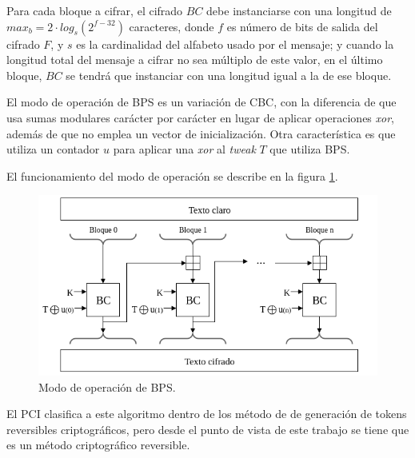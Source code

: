 Para cada bloque a cifrar, el cifrado $BC$ debe instanciarse con una longitud
de $max_b = 2 \cdot log_s(2^{f-32})$ caracteres, donde $f$ es número de bits
de salida del cifrado $F$, y $s$ es la cardinalidad del alfabeto usado por el
mensaje; y cuando la longitud total del mensaje a cifrar no sea múltiplo de
este valor, en el último bloque, $BC$ se tendrá que instanciar con una longitud
igual a la de ese bloque.

El modo de operación de BPS es un variación de CBC, con la diferencia de que
usa sumas modulares carácter por carácter en lugar de aplicar operaciones
\textit{xor}, además de que no emplea un vector de inicialización.
Otra característica es que utiliza un contador $u$ para aplicar una \textit{xor}
al \textit{tweak} $T$ que utiliza BPS.

El funcionamiento del modo de operación se describe en la figura \ref{modo_bps}.

\begin{figure}
  \begin{center}
    \includegraphics[width=0.85\linewidth]
    {../../../diagramas_comunes/bps/modo_de_operacion_bps}
    \caption{Modo de operación de BPS.}
    \label{modo_bps}
   \end{center}
\end{figure}

El PCI clasifica a este algoritmo dentro de los método de de generación de
tokens reversibles criptográficos, pero desde el punto de vista de este
trabajo se tiene que es un método criptográfico reversible.

